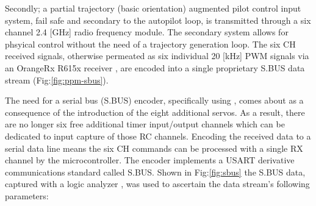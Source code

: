 \par
Secondly; a partial trajectory (basic orientation) augmented pilot control input system, fail safe and secondary to the autopilot loop, is transmitted through a six channel 2.4 [GHz] radio frequency module. The secondary system allows for phsyical control without the need of a trajectory generation loop. The six CH received signals, otherwise permeated as six individual 20 [kHz] PWM signals via an OrangeRx R615x receiver \cite{r615x}, are encoded into a single proprietary S.BUS data stream (Fig:\ref{fig:ppm-sbus}). 
\par
The need for a serial bus (S.BUS) encoder, specifically using \cite{sbusencoder}, comes about as a consequence of the introduction of the eight additional servos. As a result, there are no longer six free additional timer input/output channels which can be dedicated to input capture of those RC channels. Encoding the received data to a serial data line means the six CH commands can be processed with a single RX channel by the microcontroller. The encoder implements a USART derivative communications standard called S.BUS. Shown in Fig:\ref{fig:sbus} the S.BUS data, captured with a logic analyzer \cite{saleae}, was used to ascertain the data stream's following parameters:
\par
